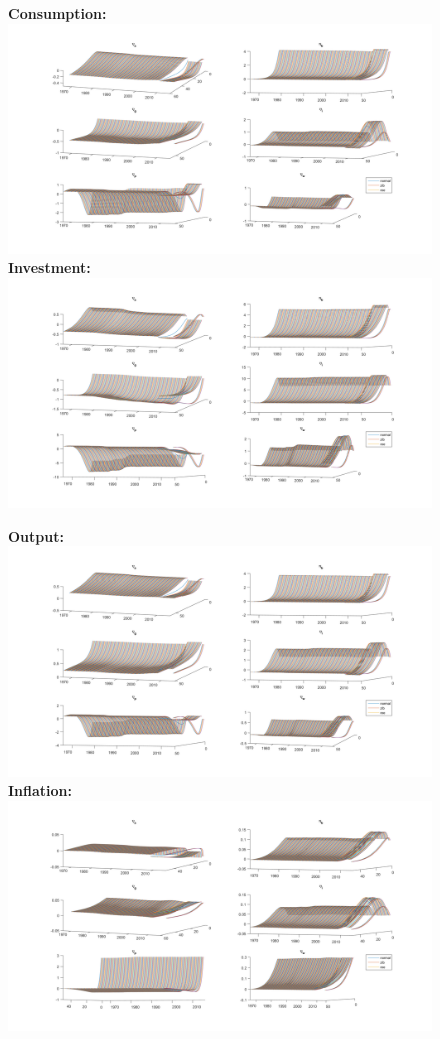 \documentclass[12pt,reqno]{article}
\numberwithin{equation}{section}
\begin{document}
\begin{figure}[H]
\textbf{Consumption:}\\
\includegraphics[scale=0.5]{MSV_impresp_cons_3d.pdf}
\textbf{Investment:}\\
\includegraphics[scale=0.5]{MSV_impresp_inv_3d.pdf}

\end{figure}

\begin{figure}[H]
\textbf{Output:}\\
\includegraphics[scale=0.5]{MSV_impresp_output_3d.pdf}
\textbf{Inflation:}\\
\includegraphics[scale=0.5]{MSV_impresp_pinf_3d.pdf}

\end{figure}
\end{document}
